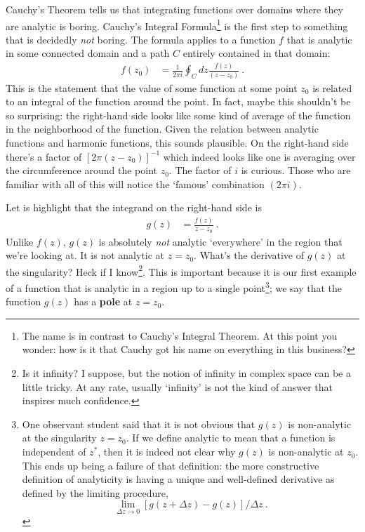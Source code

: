 Cauchy's Theorem tells us that integrating functions over domains where they are analytic is boring. Cauchy's Integral Formula\footnote{The name is in contrast to Cauchy's Integral Theorem. At this point you wonder: how is it that Cauchy got his name on everything in this business?} is the first step to something that is decidedly \emph{not} boring. The formula applies to a function $f$ that is analytic in some connected domain and a path $C$ entirely contained in that domain:
\begin{align}
  f(z_0) &= \frac{1}{2\pi i} \oint_C dz \frac{f(z)}{(z-z_0)}  \ .
  \label{eq:cauchy:integral}
\end{align}
This is the statement that the value of some function at some point $z_0$ is related to an integral of the function around the point. In fact, maybe this shouldn't be so surprising: the right-hand side looks like some kind of average of the function in the neighborhood of the function. Given the relation between analytic functions and harmonic functions, this sounds plausible. On the right-hand side there's a factor of $[2\pi (z-z_0)]^{-1}$ which indeed looks like one is averaging over the circumference around the point $z_0$. The factor of $i$ is curious. Those who are familiar with all of this will notice the `famous' combination $(2\pi i)$.

Let is highlight that the integrand on the right-hand side is 
\begin{align}
  g(z) &= \frac{f(z)}{z-z_0} \ .
  \label{eq:g:z:cauchy:integral:theorem}
\end{align}
Unlike $f(z)$, $g(z)$ is absolutely \emph{not} analytic `everywhere' in the region that we're looking at. It is not analytic at $z=z_0$. What's the derivative of $g(z)$ at the singularity? Heck if I know\footnote{Is it infinity? I suppose, but the notion of infinity in complex space can be a little tricky. At any rate, usually `infinity' is not the kind of answer that inspires much confidence.}. This is important because it is our first example of a function that is analytic in a region up to a single point\footnote{%
%
One observant student said that it is not obvious that $g(z)$ is non-analytic at the singularity $z=z_0$. If we define analytic to mean that a function is independent of $z^*$, then it is indeed not clear why $g(z)$ is non-analytic at $z_0$. This ends up being a failure of that definition: the more constructive definition of analyticity is having a unique and well-defined derivative as defined by the limiting procedure, $$\lim_{\Delta z\to 0}[g(z+\Delta z)-g(z)]/\Delta z \ .$$ 
%
}; we say that the function $g(z)$ has a \textbf{pole} at $z=z_0$.

